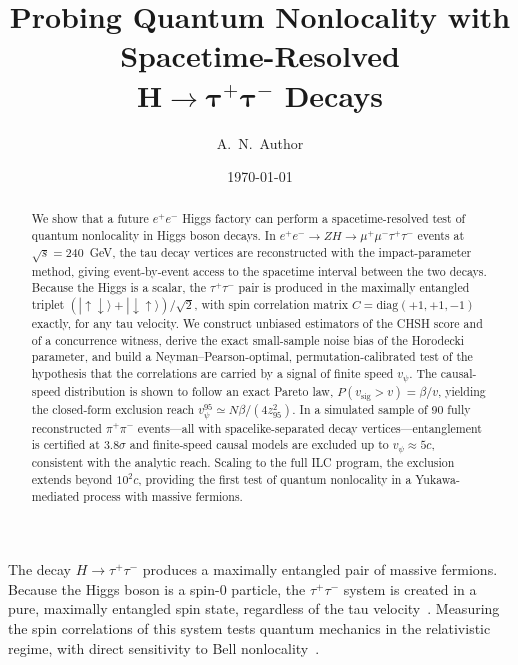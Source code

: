 \documentclass[prl,twocolumn,superscriptaddress,floatfix]{revtex4-2}
\newcommand{\ee}{e^+e^-}
\newcommand{\tautau}{\tau^+\tau^-}
\newcommand{\mumu}{\mu^+\mu^-}
\newcommand{\Htautau}{H\!\to\!\tautau}
\newcommand{\vpsi}{v_\psi}
\newcommand{\vsig}{v_{\mathrm{sig}}}
\newcommand{\sqrts}{\sqrt{s}}
\begin{document}
\title{Probing Quantum Nonlocality with Spacetime-Resolved\\
  \texorpdfstring{$\bm{H\!\to\!\tau^+\tau^-}$}{H -> tau+tau-} Decays}

\author{A.~N.~Author}

\date{\today}

\begin{abstract}
We show that a future $\ee$ Higgs factory can perform a
spacetime-resolved test of quantum nonlocality in Higgs boson decays.
In $\ee\!\to\!ZH\!\to\!\mumu\tautau$ events at $\sqrts=240$~GeV, the
tau decay vertices are reconstructed with the impact-parameter method,
giving event-by-event access to the spacetime interval between the two
decays.  Because the Higgs is a scalar, the $\tautau$ pair is produced
in the maximally entangled triplet
$(|{\uparrow\downarrow}\rangle+|{\downarrow\uparrow}\rangle)/\sqrt{2}$,
with spin correlation matrix $C=\mathrm{diag}(+1,+1,-1)$ exactly, for
any tau velocity.  We construct unbiased estimators of the CHSH score
and of a concurrence witness, derive the exact small-sample noise bias
of the Horodecki parameter, and build a Neyman--Pearson-optimal,
permutation-calibrated test of the hypothesis that the correlations
are carried by a signal of finite speed $\vpsi$.  The causal-speed
distribution is shown to follow an exact Pareto law,
$P(\vsig>v)=\beta/v$, yielding the closed-form exclusion reach
$\vpsi^{95}\simeq N\beta/(4z_{95}^2)$.  In a simulated sample of 90
fully reconstructed $\pi^+\pi^-$ events---all with spacelike-separated
decay vertices---entanglement is certified at $3.8\sigma$ and
finite-speed causal models are excluded up to $\vpsi\approx 5c$,
consistent with the analytic reach.  Scaling to the full ILC program,
the exclusion extends beyond $10^{2}c$, providing the first test of
quantum nonlocality in a Yukawa-mediated process with massive fermions.
\end{abstract}

\maketitle


The decay $\Htautau$ produces a maximally entangled pair of massive
fermions.  Because the Higgs boson is a spin-0 particle, the
$\tautau$ system is created in a pure, maximally entangled spin state,
regardless of the tau velocity~\cite{Fabbrichesi2022,Altakach2023,Barr2024}.
Measuring the spin correlations of this system tests quantum
mechanics in the relativistic regime, with direct sensitivity
to Bell nonlocality~\cite{EPR1935,Bell1964,CHSH1969}.
\end{document}
